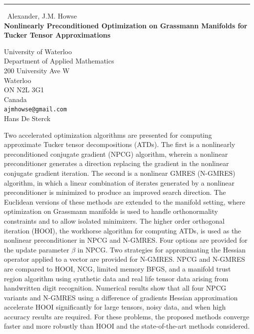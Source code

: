 \documentclass{report}
\begin{document}
\begin{center}
\rule{6in}{1pt} \
{\large Alexander, J.M. Howse \\
{\bf Nonlinearly Preconditioned Optimization on Grassmann Manifolds for Tucker Tensor Approximations}}

University of Waterloo \\ Department of Applied Mathematics \\ 200 University Ave W \\ Waterloo \\ ON N2L 3G1 \\ Canada
\\
{\tt ajmhowse@gmail.com}\\
Hans De Sterck\end{center}

Two accelerated optimization algorithms are presented for computing
approximate Tucker tensor decompositions (ATDs). The first is a
nonlinearly preconditioned conjugate gradient (NPCG) algorithm, wherein a
nonlinear preconditioner generates a direction replacing the gradient in
the nonlinear conjugate gradient iteration. The second is a nonlinear
GMRES (N-GMRES) algorithm, in which a linear combination of iterates
generated by a nonlinear preconditioner is minimized to produce an
improved search direction. The Euclidean versions of these methods are
extended to the manifold setting, where optimization on Grassmann
manifolds is used to handle orthonormality constraints and to allow
isolated minimizers. The higher order orthogonal iteration (HOOI), the
workhorse algorithm for computing ATDs, is used as the nonlinear
preconditioner in NPCG and N-GMRES. Four options are provided for the
update parameter $\beta$ in NPCG. Two strategies for approximating the
Hessian operator applied to a vector are provided for N-GMRES. NPCG and
N-GMRES are compared to HOOI, NCG, limited memory BFGS, and a manifold
trust region algorithm using synthetic data and real life tensor data
arising from handwritten digit recognition. Numerical results show that
all four NPCG variants and N-GMRES using a difference of gradients
Hessian approximation accelerate HOOI significantly for large tensors,
noisy data, and when high accuracy results are required. For these
problems, the proposed methods converge faster and more robustly than
HOOI and the state-of-the-art methods considered.
\end{document}
